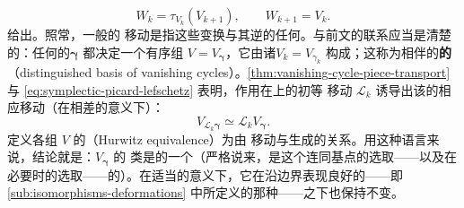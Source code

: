 \begin{equation}\label{eq:hurwitz-move-spheres}
W_k=\tau_{V_k}(V_{k+1}),\qquad W_{k+1}=V_k.
\end{equation}
给出。照常，一般的 \trHurwitz{}移动是指这些变换与其逆的任何\trComposition{}。与前文的联系应当是清楚的：任何\trVanishingPath{}的\trDistinguishedBasis{}$\boldsymbol{\gamma}$ 都决定一个有序组 $V=V_{\boldsymbol{\gamma}}$，它由诸\trVanishingCycle{}$V_k=V_{\gamma_k}$ 构成；这称为相伴的\textbf{\trVanishingCycle{}的\trDistinguishedBasis}（distinguished basis of vanishing cycles）。\cref{thm:vanishing-cycle-piece-transport}与 \eqref{eq:symplectic-picard-lefschetz} 表明，作用在\trVanishingPath{}上的初等 \trHurwitz{}移动 $\mathscr{L}_k$ 诱导出该\trDistinguishedBasis{}的相应移动（在相差\trIsotopy{}的意义下）：
\begin{equation*}
V_{\mathscr{L}_k\boldsymbol{\gamma}}\simeq\mathscr{L}_kV_{\boldsymbol{\gamma}}.
\end{equation*}
定义各组 $V$ 的\textbf{\trHurwitz{}\trEquivalence}（Hurwitz equivalence）为由 \trHurwitz{}移动与\trIsotopy{}生成的\trEquivalence{}关系。用这种语言来说，结论就是：$V_{\boldsymbol{\gamma}}$ 的 \trHurwitz{}\trEquivalence{}类是\trLefschetzFibration{}的一个\trInvariant（严格说来，是这个\trFibration{}连同基点的选取——以及在必要时\trBasePath{}的选取——的\trInvariant）。在适当的意义下，它在沿\trHorizontal{}边界表现良好的\trDeformation{}——即 \cref{sub:isomorphisms-deformations} 中所定义的那种——之下也保持不变。
